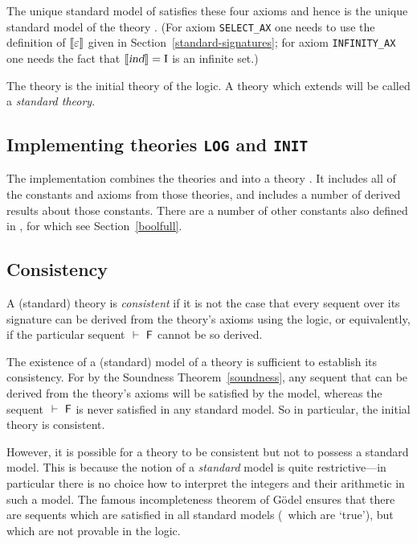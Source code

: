 The unique standard model of  satisfies these four axioms
and hence is the unique standard model of the theory
. (For axiom
{\small\tt SELECT\_AX} one needs to use the definition of
$[\![\varepsilon]\!]$ given in Section~\ref{standard-signatures}; for axiom
{\small\tt INFINITY\_AX} one needs the fact that $[\![\textsl{ind}]\!]=\mbox{\rm I}$ is
an infinite set.)

The theory  is the initial theory of the
\HOL{} logic. A theory which extends  will be called a
{\em standard theory}.

\subsection{Implementing theories \texttt{LOG} and \texttt{INIT}}
\label{sec:implementing-log-init}

The implementation combines the theories  and
 into a theory .  It includes all of the
constants and axioms from those theories, and includes a number of
derived results about those constants.  There are a number of other
constants also defined in , for which see
Section~\ref{boolfull}.

\subsection{Consistency}
\label{consistency}

A (standard) theory is {\em consistent\/} if
it is not the case that every sequent over its signature can be
derived from the theory's axioms using the \HOL{} logic, or
equivalently, if the particular sequent $\ \vdash\ {\sf F}$ cannot be so derived.

The existence of a (standard) model of a theory is sufficient to
establish its consistency. For by the Soundness
Theorem~\ref{soundness}, any sequent that can be derived from the
theory's axioms will be satisfied by the model, whereas the sequent
$\ \vdash\ {\sf F}$ is never satisfied in any standard model.  So in particular,
the initial theory  is consistent.

However, it is possible for a theory to be consistent but not to
possess a standard model. This is because the notion of a {\em
standard\/} model is quite restrictive---in particular there is no
choice how to interpret the integers and their arithmetic in such a
model. The famous incompleteness theorem of G\"odel ensures that there
are sequents which are satisfied in all standard models (\ie\ which are
`true'), but which are not provable in the \HOL{} logic.





